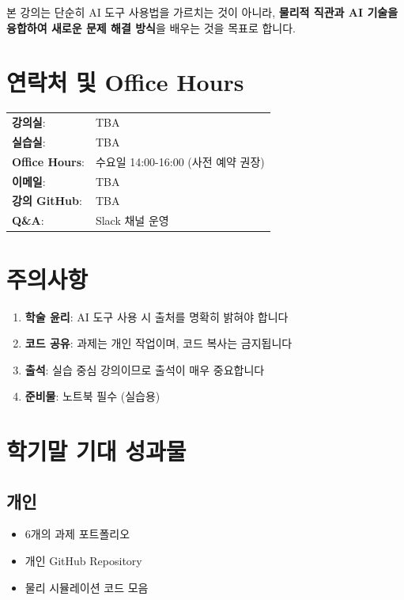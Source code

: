 \documentclass[11pt,a4paper]{article}
\begin{document}
본 강의는 단순히 AI 도구 사용법을 가르치는 것이 아니라, \textbf{물리적 직관과 AI 기술을 융합하여 새로운 문제 해결 방식}을 배우는 것을 목표로 합니다.

\section{연락처 및 Office Hours}

\begin{tabular}{ll}
\textbf{강의실}: & TBA \\
\textbf{실습실}: & TBA \\
\textbf{Office Hours}: & 수요일 14:00-16:00 (사전 예약 권장) \\
\textbf{이메일}: & TBA \\
\textbf{강의 GitHub}: & TBA \\
\textbf{Q\&A}: & Slack 채널 운영 \\
\end{tabular}

\section{주의사항}

\begin{enumerate}[noitemsep]
    \item \textbf{학술 윤리}: AI 도구 사용 시 출처를 명확히 밝혀야 합니다
    \item \textbf{코드 공유}: 과제는 개인 작업이며, 코드 복사는 금지됩니다
    \item \textbf{출석}: 실습 중심 강의이므로 출석이 매우 중요합니다
    \item \textbf{준비물}: 노트북 필수 (실습용)
\end{enumerate}

\section{학기말 기대 성과물}

\subsection{개인}
\begin{itemize}[noitemsep]
    \item 6개의 과제 포트폴리오
    \item 개인 GitHub Repository
    \item 물리 시뮬레이션 코드 모음
\end{itemize}
\end{document}
